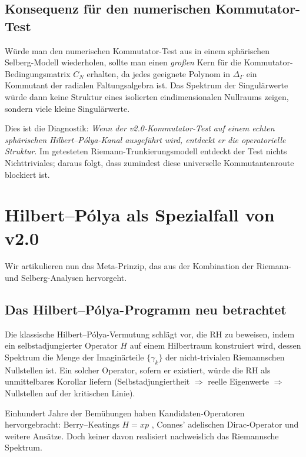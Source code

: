 \documentclass[12pt,a4paper]{article}
\theoremstyle{definition}
\theoremstyle{remark}
\newcommand{\Delop}{\Delta_{\Gamma}}
\begin{document}
\subsection{Konsequenz für den numerischen Kommutator-Test}

Würde man den numerischen Kommutator-Test aus
\cite[Abschnitt~5.3]{Geiger2026partII} in einem sphärischen Selberg-Modell
wiederholen, sollte man einen \emph{großen} Kern für die
Kommutator-Bedingungsmatrix $C_N$ erhalten, da jedes geeignete Polynom in
$\Delop$ ein Kommutant der radialen Faltungsalgebra ist. Das Spektrum der
Singulärwerte würde dann keine Struktur eines isolierten eindimensionalen
Nullraums zeigen, sondern viele kleine Singulärwerte.

Dies ist die Diagnostik: \emph{Wenn der v2.0-Kommutator-Test auf einem echten
sphärischen Hilbert--Pólya-Kanal ausgeführt wird, entdeckt er die
operatorielle Struktur}. Im getesteten Riemann-Trunkierungsmodell entdeckt der
Test nichts Nichttriviales; daraus folgt, dass zumindest diese universelle
Kommutantenroute blockiert ist.

\section{\texorpdfstring{Hilbert--Pólya als Spezialfall von v2.0}{Hilbert--Polya als Spezialfall von v2.0}}
\label{sec:meta}

Wir artikulieren nun das Meta-Prinzip, das aus der Kombination der
Riemann- und Selberg-Analysen hervorgeht.

\subsection{\texorpdfstring{Das Hilbert--Pólya-Programm neu betrachtet}{Das Hilbert--Polya-Programm neu betrachtet}}

Die klassische Hilbert--Pólya-Vermutung schlägt vor, die RH zu beweisen, indem ein
selbstadjungierter Operator $H$ auf einem Hilbertraum konstruiert wird, dessen Spektrum die Menge der
Imaginärteile $\{\gamma_k\}$ der nicht-trivialen Riemannschen Nullstellen ist. Ein solcher
Operator, sofern er existiert, würde die RH als unmittelbares Korollar liefern
(Selbstadjungiertheit $\Rightarrow$ reelle Eigenwerte $\Rightarrow$ Nullstellen auf
der kritischen Linie).

Einhundert Jahre der Bemühungen haben Kandidaten-Operatoren hervorgebracht:
Berry--Keatings $H = xp$ \cite{BerryKeating1999}, Connes' adelischen
Dirac-Operator \cite{Connes1999} und weitere Ansätze.
Doch keiner davon realisiert nachweislich das Riemannsche Spektrum.
\end{document}
